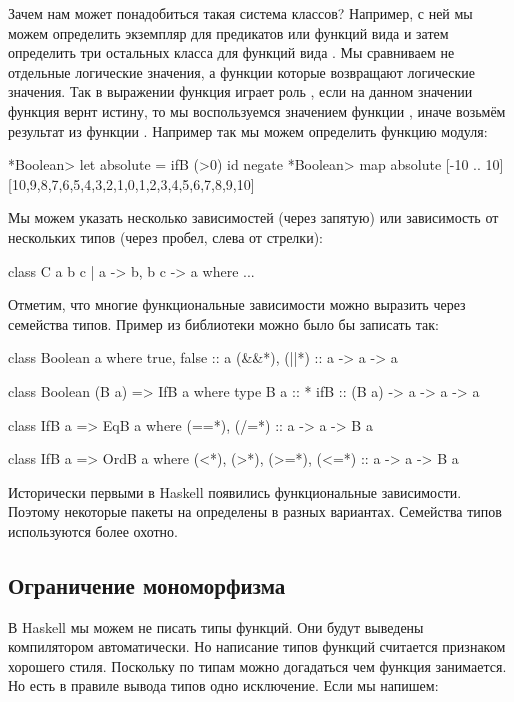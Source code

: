 Зачем нам может понадобиться
такая система классов? Например, с ней мы можем
определить экземпляр  для предикатов
или функций вида  и затем
определить три остальных класса для функций
вида . Мы сравниваем не отдельные 
логические значения, а функции которые 
возвращают логические значения. 
Так в выражении  функция
 играет роль , 
если на данном значении функция 
вернт истину, то мы воспользуемся
значением функции , иначе возьмём
результат из функции . 
Например так мы можем определить функцию модуля:

\begin{code}
*Boolean> let absolute = ifB (>0) id negate
*Boolean> map absolute [-10 .. 10]
[10,9,8,7,6,5,4,3,2,1,0,1,2,3,4,5,6,7,8,9,10]
\end{code}

Мы можем указать несколько зависимостей (через запятую) 
или зависимость от нескольких типов 
(через пробел, слева от стрелки):

\begin{code}
class C a b c | a -> b, b c -> a where
    ...
\end{code}

Отметим, что многие функциональные зависимости
можно выразить через семейства типов. 
Пример из библиотеки  
можно было бы записать так:

\begin{code}
class Boolean a where
    true, false     :: a
    (&&*), (||*)    :: a -> a -> a

class Boolean (B a) => IfB a where
    type B a :: *
    ifB :: (B a) -> a -> a -> a

class IfB a => EqB a where
    (==*), (/=*) :: a -> a -> B a
               
class IfB a => OrdB a where
    (<*), (>*), (>=*), (<=*) :: a -> a -> B a
\end{code}

Исторически первыми в Haskell появились функциональные зависимости.
Поэтому некоторые пакеты на  определены в разных
вариантах. Семейства типов используются более охотно.


\subsection{Ограничение мономорфизма}

В Haskell мы можем не писать типы функций. Они будут
выведены компилятором автоматически. Но написание 
типов функций считается признаком хорошего стиля. 
Поскольку по типам можно догадаться чем функция
занимается. Но есть в правиле вывода типов одно исключение. 
Если мы напишем:

